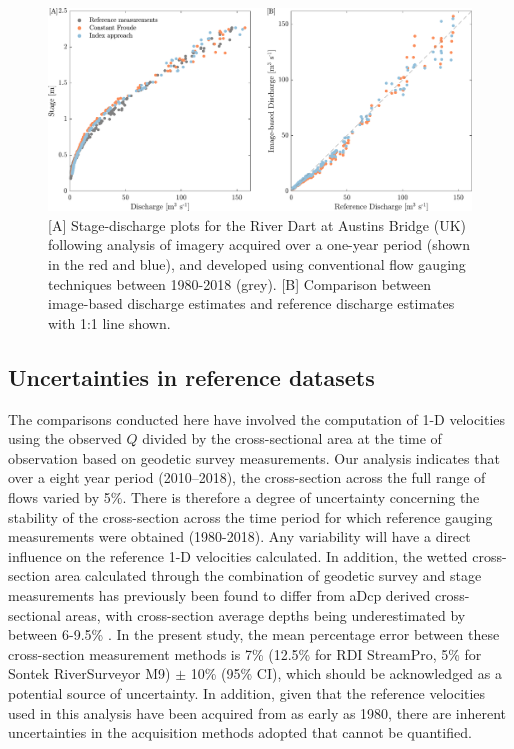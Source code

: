 \documentclass[hess, manuscript]{copernicus} %
\begin{document}
\begin{figure}[!htb]
\centering 
\includegraphics[width=\textwidth]{Main/Initial_submission_2024/Figures/Figure8_v2.pdf}
\caption{[A] Stage-discharge plots for the River Dart at Austins Bridge (UK) following analysis of imagery acquired over a one-year period (shown in the red and blue), and developed using conventional flow gauging techniques between 1980-2018 (grey). [B] Comparison between image-based discharge estimates and reference discharge estimates with 1:1 line shown.}
\label{Figure8} 
\end{figure}

\subsection{Uncertainties in reference datasets}
The comparisons conducted here have involved the computation of 1-D velocities using the observed $Q$ divided by the cross-sectional area at the time of observation based on geodetic survey measurements. Our analysis indicates that over a eight year period (2010--2018), the cross-section across the full range of flows varied by 5\%. There is therefore a degree of uncertainty concerning the stability of the cross-section across the time period for which reference gauging measurements were obtained (1980-2018). Any variability will have a direct influence on the reference 1-D velocities calculated. In addition, the wetted cross-section area calculated through the combination of geodetic survey and stage measurements has previously been found to differ from aDcp derived cross-sectional areas, with cross-section average depths being underestimated by between 6-9.5\% \citep{Kim2015}. In the present study, the mean percentage error between these cross-section measurement methods is 7\% (12.5\% for RDI StreamPro, 5\% for Sontek RiverSurveyor M9) $\pm$ 10\% (95\% CI), which should be acknowledged as a potential source of uncertainty. In addition, given that the reference velocities used in this analysis have been acquired from as early as 1980, there are inherent uncertainties in the acquisition methods adopted that cannot be quantified.
\end{document}
